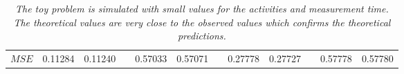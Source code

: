 \documentclass[report,12pt]{report}
\begin{document}
\begin{table}[H]
{\begin{tabular}{lrrlrrlrrlrr}
\multicolumn{1}{|l|}{$MSE$}                                          & \multicolumn{1}{r|}{0.11284} & \multicolumn{1}{r|}{0.11240} & \multicolumn{1}{l|}{} & \multicolumn{1}{r|}{0.57033}  & \multicolumn{1}{r|}{0.57071}  & \multicolumn{1}{l|}{} & \multicolumn{1}{r|}{0.27778} & \multicolumn{1}{r|}{0.27727} & \multicolumn{1}{l|}{} & \multicolumn{1}{r|}{0.57778} & \multicolumn{1}{r|}{0.57780} \\ \cline{1-3} \cline{5-6} \cline{8-9} \cline{11-12} 
\end{tabular}}
\caption{\emph{The toy problem is simulated with small values for the activities and measurement time. The theoretical values are very close to the observed values which confirms the theoretical predictions.}}
\label{tab:simulation1}

\hfill\\
\hfill\\
\hfill\\
\hfill\\


\end{table}
\end{document}
